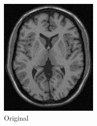 \documentclass[letterpaper,12pt]{article}
\theoremstyle{plain}
\begin{document}
\begin{figure}[h]
    \centering
         \begin{subfigure}[h]{0.24\linewidth}
            \centering
            \includegraphics[width=\textwidth]{Figuras/ImagenA.png}
            \caption{Original} 
         \end{subfigure}
         \begin{subfigure}[h]{0.24\linewidth}
            \centering

\end{subfigure}
\end{figure}
\end{document}
